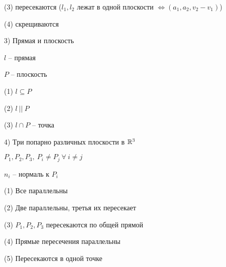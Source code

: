 (3) пересекаются ($l_1, l_2$ лежат в одной плоскости $\Leftrightarrow (a_1, a_2, v_2 - v_1)$)

(4) скрещиваются

\vspace{\baselineskip}
3) Прямая и плоскость

$l$ -- прямая

$P$ -- плоскость

(1) $l \subseteq P$

(2) $l \ || \ P$

(3) $l \cap P$ -- точка

\vspace{\baselineskip}
4) Три попарно различных плоскости в $\mathbb{R}^3$

$P_1, P_2, P_3, \ P_i \neq P_j \ \forall \ i \neq j$

$n_i$ -- нормаль к $P_i$

(1) Все параллельны

(2) Две параллельны, третья их пересекает

(3) $P_1, P_2, P_3$ пересекаются по общей прямой

(4) Прямые пересечения параллельны

(5) Пересекаются в одной точке


